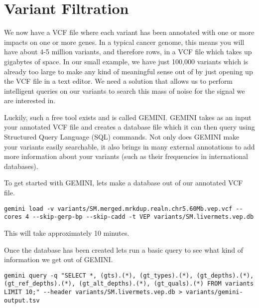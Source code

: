
\section{Variant Filtration}

We now have a VCF file where each variant has been annotated with one or more impacts on one or more genes. In a typical cancer genome, this means you will have about 4-5 million variants, and therefore rows, in a VCF file which takes up gigabytes of space. In our small example, we have just 100,000 variants which is already too large to make any kind of meaningful sense out of by just opening up the VCF file in a text editor. We need a solution that allows us to perform intelligent queries on our variants to search this mass of noise for the signal we are interested in.

Luckily, such a free tool exists and is called GEMINI. GEMINI takes as an input your annotated VCF file and creates a database file which it can then query using Structured Query Language (SQL) commands. Not only does GEMINI make your variants easily searchable, it also brings in many external annotations to add more information about your variants (such as their frequencies in international databases).

\begin{steps}
To get started with GEMINI, lets make a database out of our annotated VCF file.
\begin{lstlisting}
gemini load -v variants/SM.merged.mrkdup.realn.chr5.60Mb.vep.vcf --cores 4 --skip-gerp-bp --skip-cadd -t VEP variants/SM.livermets.vep.db
\end{lstlisting}
\end{steps}

This will take approximately 10 minutes.

Once the database has been created lets run a basic query to see what kind of information we get out of GEMINI.

\begin{steps}
\begin{lstlisting}
gemini query -q "SELECT *, (gts).(*), (gt_types).(*), (gt_depths).(*), (gt_ref_depths).(*), (gt_alt_depths).(*), (gt_quals).(*) FROM variants LIMIT 10;" --header variants/SM.livermets.vep.db > variants/gemini-output.tsv
\end{lstlisting}
\end{steps}

